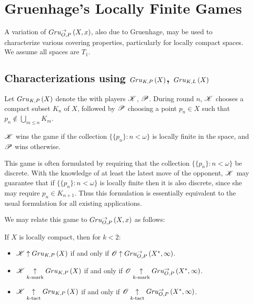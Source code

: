 
\chapter{Gruenhage's Locally Finite Games}

A variation of $Gru_{O,P}^{\to}\left({X},{x}\right)$, also due to Gruenhage,
may be used to characterize various covering properties, particularly
for locally compact spaces. We assume all spaces are $T_1$.

\section{Characterizations using $Gru_{K,P}\left({X}\right)$, $Gru_{K,L}\left({X}\right)$}

\begin{game}
  Let $Gru_{K,P}\left({X}\right)$ denote the 
  with players $\mathscr{K}$, $\mathscr{P}$. During round $n$, $\mathscr{K}$ chooses
  a compact subset $K_n$ of $X$, followed by $\mathscr{P}$ choosing a point
  $p_n\in X$ such that $p_n\not\in \bigcup_{m\leq n}K_m$.

  $\mathscr{K}$ wins the game if the collection $\{\{p_n\}:n<\omega\}$ is locally
  finite in the space, and $\mathscr{P}$ wins otherwise.
\end{game}

This game is often formulated by requiring that the collection
$\{\{p_n\}:n<\omega\}$ be discrete. With the knowledge of at least the latest
move of the opponent, $\mathscr{K}$ may guarantee that if $\{\{p_n\}:n<\omega\}$
is locally finite then it is also discrete, since she may require
$p_n\in K_{n+1}$. Thus this formulation is essentially equivalent to the usual
formulation for all existing applications.

We may relate this game to $Gru_{O,P}^{\to}\left({X},{x}\right)$ as follows:

\begin{thm}
  If $X$ is locally compact, then for $k<2$:
    \begin{itemize}
      \item $\mathscr{K}\uparrow Gru_{K,P}\left({X}\right)$ if and only if
        $\mathscr{O}\uparrow Gru_{O,P}^{\to}\left({X^*},{\infty}\right)$.
      \item $\mathscr{K}\underset{k\text{-mark}}{\uparrow}Gru_{K,P}\left({X}\right)$ if and only if
        $\mathscr{O}\underset{k\text{-mark}}{\uparrow}Gru_{O,P}^{\to}\left({X^*},{\infty}\right)$.
      \item $\mathscr{K}\underset{k\text{-tact}}{\uparrow}Gru_{K,P}\left({X}\right)$ if and only if
        $\mathscr{O}\underset{k\text{-tact}}{\uparrow}Gru_{O,P}^{\to}\left({X^*},{\infty}\right)$.
    \end{itemize}
\end{thm}

